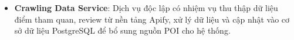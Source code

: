 \begin{itemize}
    \item \textbf{Crawling Data Service}: Dịch vụ độc lập có nhiệm vụ thu thập dữ liệu điểm tham quan, review từ nền tảng Apify, xử lý dữ liệu và cập nhật vào cơ sở dữ liệu PostgreSQL để bổ sung nguồn POI cho hệ thống.
\end{itemize}